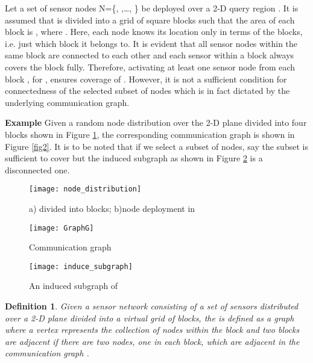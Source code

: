 \documentclass{acm_proc_article-sp}
\newtheorem{definition}{Definition}
\begin{document}
Let a set of  sensor nodes {\cal N}={\{, ,\ldots, \}} be deployed over a 2-D query region . It is assumed that  is divided into a grid of square blocks  such that the area of each block is , where . Here, each node knows its location only in terms of the blocks, i.e. just which block it belongs to. It is evident that all sensor nodes within the same block are connected to each other and each sensor within a block always covers the block fully. Therefore, activating at least one sensor node from each block , for , ensures  coverage of . However, it is not a sufficient condition for connectedness of the selected subset of nodes which is in fact dictated by the underlying communication graph. 
 \vspace{-0.5cm}
\begin{paragraph}
 {\bf Example} Given a random node distribution over the 2-D plane  divided into four blocks shown in Figure \ref{fig1}, the corresponding communication graph is shown in Figure \ref{fig2}. It is to be noted that if we select a subset of nodes, say  the subset is sufficient to cover  but the induced subgraph as shown in Figure \ref{inducedgraph} is a disconnected one.\\
\end{paragraph}
\vspace{-0.5cm}
\begin{figure}[ht]
\centering
 \texttt{[image: node\_distribution]}
\caption{\scriptsize{a) divided into blocks; b)node deployment in }}
 \label{fig1}
 \vspace{-0.1cm}
\end{figure}
\begin{figure}[ht]
\hspace{0.6cm}
\begin{minipage}[b]{0.38\linewidth}
\centering
 \texttt{[image: GraphG]}
\caption{\scriptsize{Communication graph  }}
 \label{fig2}
\end{minipage}
\hspace{0.5cm}
\begin{minipage}[b]{0.38\linewidth}
\centering
 \texttt{[image: induce\_subgraph]}
\caption{\scriptsize{An induced subgraph of  }}
\label{inducedgraph}
\end{minipage}
\end{figure}
\vspace{-0.7cm}
 \begin{definition}Given a sensor network consisting of a set of sensors  distributed over a 2-D plane  divided into a virtual grid of blocks, the   is defined as a graph where a vertex  represents the collection of nodes within the block  and two blocks are adjacent if there are two nodes, one in each block, which are adjacent in the communication graph  \cite{Arvind}.
 \end{definition}
\end{document}

